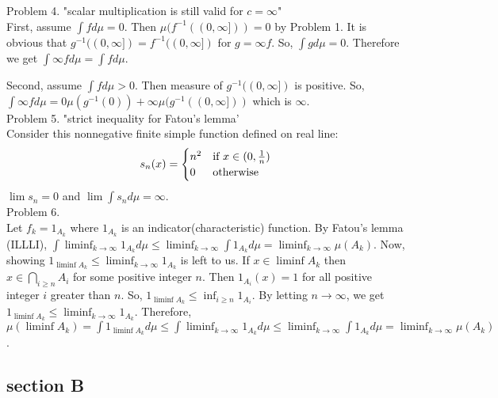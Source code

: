 \documentclass{amsart}
\begin{document}
Problem 4. "scalar multiplication is still valid for $c = \infty$" \\

First, assume $\int f d\mu = 0$. Then $\mu(f^{-1}((0, \infty])) = 0$ by Problem 1.
It is obvious that $g^{-1}((0, \infty]) = f^{-1}((0, \infty])$ for $g = \infty f$.
So, $\int g d\mu = 0$. Therefore we get $\int \infty f d\mu = \int f d\mu$.

Second, assume $\int f d\mu > 0$. Then measure of $g ^ {-1} ((0, \infty ])$ is positive.
So, $\int \infty f d \mu = 0 \mu ( g ^ {-1} (0)) + \infty \mu(g^{-1}((0, \infty]))$ which is $\infty$.\\

Problem 5. "strict inequality for Fatou's lemma'\\

Consider this nonnegative finite simple function defined on real line:
\begin{equation*}
    s_n(x) = \begin{cases}
        n^2 & \text{if } x \in (0, {1 \over n}) \\
        0 & \text{otherwise}
    \end{cases}
\end{equation*}
$\lim s_n = 0$ and $\lim \int s_n d\mu = \infty$.\\

Problem 6.\\

Let $f_k = 1_{A_k}$ where $1_{A_k}$ is an indicator(characteristic) function.
By Fatou's lemma (ILLLI), $\int \liminf_{k \rightarrow \infty} 1_{A_k} d\mu \leq \liminf_{k \rightarrow \infty} \int 1_{A_k}d\mu = \liminf_{k \rightarrow \infty} \mu(A_k)$.
Now, showing $1_{\liminf A_k} \leq \liminf_{k\rightarrow \infty}1_{A_k}$ is left to us.
If $x \in \liminf A_k$ then $x \in \bigcap_{i\geq n} A_i$ for some positive integer $n$.
Then $1_{A_i}(x) = 1$ for all positive integer $i$ greater than $n$. So, $1_{\liminf A_k} \leq \inf_{i\geq n} 1_{A_i}$.
By letting $n \rightarrow \infty$, we get $1_{\liminf A_k} \leq \liminf_{k\rightarrow \infty}1_{A_k}$.
Therefore, $\mu(\liminf A_k) = \int 1_{\liminf A_k}d\mu \leq \int \liminf_{k \rightarrow \infty} 1_{A_k} d\mu \leq \liminf_{k \rightarrow \infty} \int 1_{A_k}d\mu = \liminf_{k \rightarrow \infty} \mu(A_k)$.\\

\subsection*{section B}\hfill \\
\end{document}
